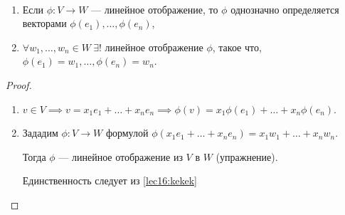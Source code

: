 \begin{proposal}~
    \label{lec16:propopop}
    \begin{enumerate}
    \item Если $\phi : V \to W$ --- линейное отображение, то $\phi$ однозначно определяется векторами $\phi(e_1), \dots, \phi(e_n)$,
    \item $\forall w_1, \dots, w_n \in W \ \exists!$ линейное отображение $\phi$, такое что, $\phi(e_1) = w_1, \dots, \phi(e_n) = w_n$.
    \end{enumerate}
\end{proposal}

\begin{proof}~
    \begin{enumerate}
    \item \label{lec16:kekek}
        $v \in V \implies v = x_1 e_1 + \dots + x_n e_n \implies \phi(v) = x_1 \phi(e_1) + \dots + x_n \phi(e_n)$.
    \item 
        Зададим $\phi : V \to W$ формулой $\phi(x_1 e_1 + \dots + x_n e_n) = x_1 w_1 + \dots + x_n w_n$.

        Тогда $\phi$ --- линейное отображение из $V$ в $W$ (упражнение).

        Единственность следует из \ref{lec16:kekek}
        \qedhere
    \end{enumerate}
\end{proof}
